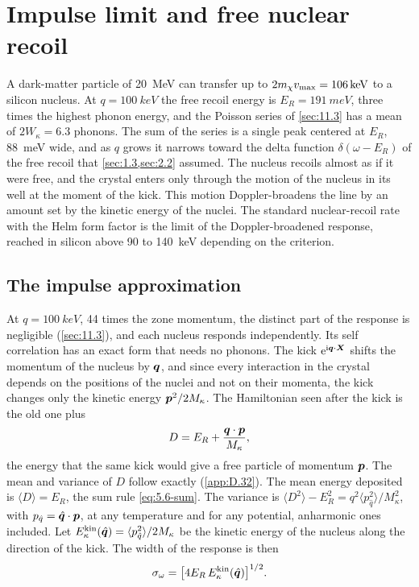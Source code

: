 \section{Impulse limit and free nuclear recoil}\label{sec:11.4}

A dark-matter particle of \SI{20}{MeV} can transfer up to $2m_{\chi} v_{\mathrm{max}} = \SI{106}{keV}$ to a silicon nucleus. At $q = \SI{100}{keV}$ the free recoil energy is $E_R = \SI{191}{meV}$, three times the highest phonon energy, and the Poisson series of \cref{sec:11.3} has a mean of $2W_\kappa = 6.3$ phonons. The sum of the series is a single peak centered at $E_R$, \SI{88}{meV} wide, and as $q$ grows it narrows toward the delta function $\delta(\omega - E_R)$ of the free recoil that \cref{sec:1.3,sec:2.2} assumed. The nucleus recoils almost as if it were free, and the crystal enters only through the motion of the nucleus in its well at the moment of the kick. This motion Doppler-broadens the line by an amount set by the kinetic energy of the nuclei. The standard nuclear-recoil rate with the Helm form factor is the limit of the Doppler-broadened response, reached in silicon above 90 to \SI{140}{keV} depending on the criterion.

\subsection{The impulse approximation}

At $q = \SI{100}{keV}$, 44 times the zone momentum, the distinct part of the response is negligible (\cref{sec:11.3}), and each nucleus responds independently. Its self correlation has an exact form that needs no phonons. The kick $\mathrm{e}^{\mathrm{i}\bm{q}\cdot\bm{X}}$ shifts the momentum of the nucleus by $\bm{q}$, and since every interaction in the crystal depends on the positions of the nuclei and not on their momenta, the kick changes only the kinetic energy $\bm{p}^2/2M_\kappa$. The Hamiltonian seen after the kick is the old one plus
\begin{equation*}
  D = E_R + \frac{\bm{q}\cdot\bm{p}}{M_\kappa} ,
\end{equation*}
the energy that the same kick would give a free particle of momentum $\bm{p}$. The mean and variance of $D$ follow exactly (\cref{app:D.32}). The mean energy deposited is $\langle D\rangle = E_R$, the sum rule \cref{eq:5.6-sum}. The variance is $\langle D^2\rangle - E_R^2 = q^2\langle p_{\hat q}^2\rangle/M_\kappa^2$, with $p_{\hat q} = \hat{\bm{q}}\cdot\bm{p}$, at any temperature and for any potential, anharmonic ones included. Let $E^{\mathrm{kin}}_\kappa(\hat{\bm{q}}) = \langle p_{\hat q}^2\rangle/2M_\kappa$ be the kinetic energy of the nucleus along the direction of the kick. The width of the response is then
\begin{equation}
  \sigma_\omega = \bigl[4E_R\,E^{\mathrm{kin}}_\kappa(\hat{\bm{q}})\bigr]^{1/2} .
  \label{eq:11.4-width}
\end{equation}


